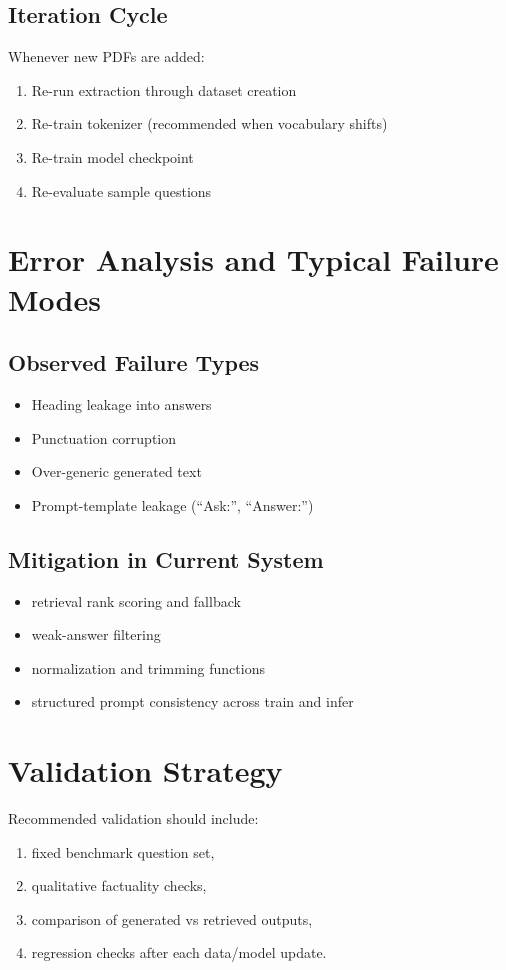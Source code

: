 \documentclass[a4paper,11pt]{article}
\begin{document}
\subsection{Iteration Cycle}
Whenever new PDFs are added:
\begin{enumerate}[leftmargin=1.5em]
    \item Re-run extraction through dataset creation
    \item Re-train tokenizer (recommended when vocabulary shifts)
    \item Re-train model checkpoint
    \item Re-evaluate sample questions
\end{enumerate}

\section{Error Analysis and Typical Failure Modes}
\subsection{Observed Failure Types}
\begin{itemize}[leftmargin=1.5em]
    \item Heading leakage into answers
    \item Punctuation corruption
    \item Over-generic generated text
    \item Prompt-template leakage (``Ask:'', ``Answer:'')
\end{itemize}

\subsection{Mitigation in Current System}
\begin{itemize}[leftmargin=1.5em]
    \item retrieval rank scoring and fallback
    \item weak-answer filtering
    \item normalization and trimming functions
    \item structured prompt consistency across train and infer
\end{itemize}

\section{Validation Strategy}
Recommended validation should include:
\begin{enumerate}[leftmargin=1.5em]
    \item fixed benchmark question set,
    \item qualitative factuality checks,
    \item comparison of generated vs retrieved outputs,
    \item regression checks after each data/model update.
\end{enumerate}
\end{document}
